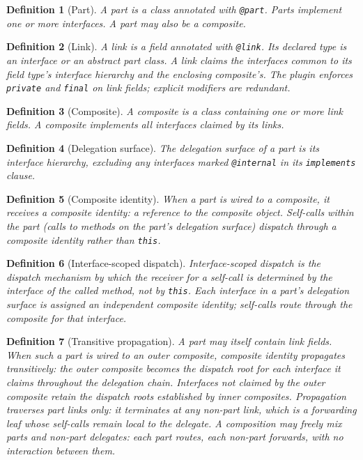 \documentclass[acmsmall,nonacm]{acmart}
\theoremstyle{acmplain}
\theoremstyle{acmdefinition}
\newtheorem{definition}{Definition}
\newcommand{\code}[1]{\texttt{#1}}
\begin{document}
\begin{definition}[Part]
A \emph{part} is a class annotated with \code{@part}. Parts implement one
or more interfaces. A part may also be a composite.
\end{definition}

\begin{definition}[Link]
A \emph{link} is a field annotated with \code{@link}. Its declared type is an
interface or an abstract part class. A link claims the interfaces common
to its field type's interface hierarchy and the enclosing composite's. The
plugin enforces \code{private} and \code{final} on link fields; explicit
modifiers are redundant.
\end{definition}

\begin{definition}[Composite]
A \emph{composite} is a class containing one or more link fields. A
composite implements all interfaces claimed by its links.
\end{definition}

\begin{definition}[Delegation surface]
The \emph{delegation surface} of a part is its interface hierarchy,
excluding any interfaces marked \code{@internal} in its \code{implements} clause.
\end{definition}

\begin{definition}[Composite identity]
When a part is wired to a composite, it receives a \emph{composite
identity}: a reference to the composite object. Self-calls within the
part (calls to methods on the part's delegation surface) dispatch through
a composite identity rather than \code{this}.
\end{definition}

\begin{definition}[Interface-scoped dispatch]
\label{def:isd}
\emph{Interface-scoped dispatch} is the dispatch mechanism by which the
receiver for a self-call is determined by the interface of the
called method, not by \code{this}. Each
interface in a part's delegation surface is assigned an independent
composite identity; self-calls route through the composite for that
interface.
\end{definition}

\begin{definition}[Transitive propagation]
A part may itself contain link fields. When such a part is wired to
an outer composite, composite identity propagates transitively: the outer composite
becomes the dispatch root for each interface it claims throughout the delegation chain.
Interfaces not claimed by the outer composite retain the dispatch roots established
by inner composites. Propagation traverses part links only: it terminates at
any non-part link, which is a forwarding leaf whose self-calls remain
local to the delegate. A composition may freely mix parts and non-part delegates: each
part routes, each non-part forwards, with no interaction between them.
\end{definition}
\end{document}
